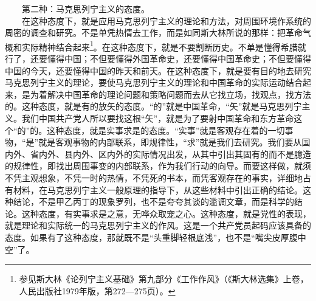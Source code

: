 \documentclass[cn,11pt,chinese]{elegantbook}
\begin{document}
　　第二种：马克思列宁主义的态度。\\
　　在这种态度下，就是应用马克思列宁主义的理论和方法，对周围环境作系统的周密的调查和研究。不是单凭热情去工作，而是如同斯大林所说的那样：把革命气概和实际精神结合起来\footnote[4]{ 参见斯大林《论列宁主义基础》第九部分《工作作风》（《斯大林选集》上卷，人民出版社1979年版，第272—275页）。}。在这种态度下，就是不要割断历史。不单是懂得希腊就行了，还要懂得中国；不但要懂得外国革命史，还要懂得中国革命史；不但要懂得中国的今天，还要懂得中国的昨天和前天。在这种态度下，就是要有目的地去研究马克思列宁主义的理论，要使马克思列宁主义的理论和中国革命的实际运动结合起来，是为着解决中国革命的理论问题和策略问题而去从它找立场，找观点，找方法的。这种态度，就是有的放矢的态度。“的”就是中国革命，“矢”就是马克思列宁主义。我们中国共产党人所以要找这根“矢”，就是为了要射中国革命和东方革命这个“的”的。这种态度，就是实事求是的态度。“实事”就是客观存在着的一切事物，“是”就是客观事物的内部联系，即规律性，“求”就是我们去研究。我们要从国内外、省内外、县内外、区内外的实际情况出发，从其中引出其固有的而不是臆造的规律性，即找出周围事变的内部联系，作为我们行动的向导。而要这样做，就须不凭主观想象，不凭一时的热情，不凭死的书本，而凭客观存在的事实，详细地占有材料，在马克思列宁主义一般原理的指导下，从这些材料中引出正确的结论。这种结论，不是甲乙丙丁的现象罗列，也不是夸夸其谈的滥调文章，而是科学的结论。这种态度，有实事求是之意，无哗众取宠之心。这种态度，就是党性的表现，就是理论和实际统一的马克思列宁主义的作风。这是一个共产党员起码应该具备的态度。如果有了这种态度，那就既不是“头重脚轻根底浅”，也不是“嘴尖皮厚腹中空”了。\\
\end{document}
